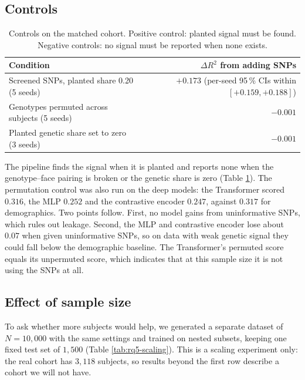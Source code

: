 \subsection{Controls}
\label{sec:rq5-controls}

\begin{table}[t]
\centering
\caption{Controls on the matched cohort. Positive control: planted signal must
be found. Negative controls: no signal must be reported when none exists.}
\label{tab:rq5-controls}
\begin{tabular}{lr}
\toprule
Condition & $\Delta R^2$ from adding SNPs \\
\midrule
Screened SNPs, planted share 0.20 (5 seeds)   & $+0.173$ (per-seed 95\,\% CIs within $[+0.159,+0.188]$) \\
Genotypes permuted across subjects (5 seeds)  & $-0.001$ \\
Planted genetic share set to zero (3 seeds)   & $-0.001$ \\
\bottomrule
\end{tabular}
\end{table}

The pipeline finds the signal when it is planted and reports none when the
genotype--face pairing is broken or the genetic share is zero (Table
\ref{tab:rq5-controls}). The permutation control was also run on the deep
models: the Transformer scored $0.316$, the MLP $0.252$ and the contrastive
encoder $0.247$, against $0.317$ for demographics. Two points follow. First, no
model gains from uninformative SNPs, which rules out leakage. Second, the MLP
and contrastive encoder lose about $0.07$ when given uninformative SNPs, so on
data with weak genetic signal they could fall below the demographic baseline.
The Transformer's permuted score equals its unpermuted score, which indicates
that at this sample size it is not using the SNPs at all.

\subsection{Effect of sample size}
\label{sec:rq5-scaling}

To ask whether more subjects would help, we generated a separate dataset of
$N=10{,}000$ with the same settings and trained on nested subsets, keeping one
fixed test set of $1{,}500$ (Table \ref{tab:rq5-scaling}). This is a scaling
experiment only: the real cohort has $3{,}118$ subjects, so results beyond the
first row describe a cohort we will not have.

